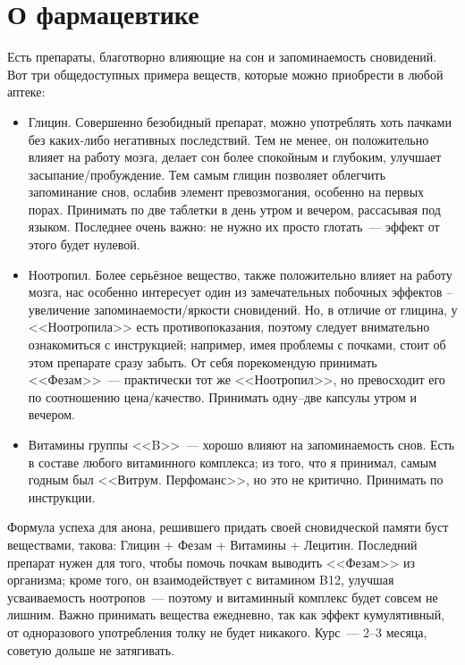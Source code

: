 \documentclass[a5paper,12pt,twoside]{memoir}
\begin{document}
\section{О фармацевтике}

Есть препараты, благотворно влияющие на сон и запоминаемость сновидений. Вот три общедоступных примера веществ, которые можно приобрести в любой аптеке:

\begin{itemize}
\item Глицин. Совершенно безобидный препарат, можно употреблять хоть пачками без каких-либо негативных последствий. Тем не менее, он положительно влияет на работу мозга,  делает сон более спокойным и глубоким, улучшает засыпание/пробуждение. Тем самым глицин позволяет облегчить запоминание снов, ослабив элемент превозмогания, особенно на первых порах. Принимать по две таблетки в день утром и вечером, рассасывая под языком. Последнее очень важно: не нужно их просто глотать~--- эффект от этого будет нулевой.

\item Ноотропил. Более серьёзное вещество, также положительно влияет на работу мозга, нас особенно интересует один из замечательных побочных эффектов – увеличение запоминаемости/яркости сновидений. Но, в отличие от глицина, у <<Ноотропила>> есть противопоказания, поэтому следует внимательно ознакомиться с инструкцией; например, имея проблемы с почками, стоит об этом препарате сразу забыть. От себя порекомендую принимать <<Фезам>>~--- практически тот же <<Ноотропил>>, но превосходит его по соотношению цена/качество. Принимать одну--две капсулы утром и вечером.

\item Витамины группы <<B>>~--- хорошо влияют на запоминаемость снов. Есть в составе любого витаминного комплекса; из того, что я принимал, самым годным был <<Витрум. Перфоманс>>, но это не критично. Принимать по инструкции.
\end{itemize}

Формула успеха для анона, решившего придать своей сновидческой памяти буст веществами, такова:  Глицин + Фезам + Витамины + Лецитин. Последний препарат нужен для того, чтобы помочь почкам выводить <<Фезам>> из организма; кроме того, он взаимодействует с витамином B12, улучшая усваиваемость ноотропов~--- поэтому и витаминный комплекс будет совсем не лишним. Важно принимать вещества ежедневно, так как эффект кумулятивный, от одноразового употребления толку не будет никакого. Курс~--- 2--3 месяца, советую дольше не затягивать.
\end{document}
